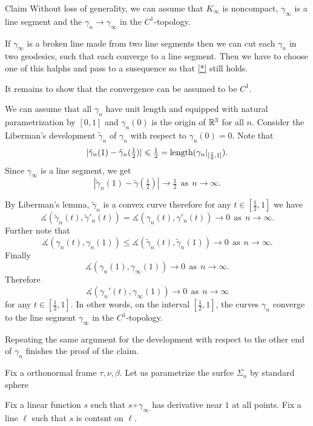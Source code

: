 \documentclass[a4paper,10pt]{amsart}
\begin{document}
\begin{thm}{Claim}
Without loss of generality, we can assume that $K_\infty$ is noncompact, $\gamma_\infty$ is a line segment 
and the $\gamma_n\to \gamma_\infty$ in the $C^1$-topology.
\end{thm}

If $\gamma_\infty$ is a broken line made from two line segments
then we can cut each $\gamma_n$ in two geodesics, such that each converge to a line segment.
Then we have to choose one of this halphs and pass to a susequence so that \ref{*} still holds.

It remains to show that the convergence can be assumed to be $C^1$.


We can assume that all $\gamma_n$ have unit length
and equipped with natural parametrization by $[0,1]$ and $\gamma_n(0)$ is the origin of $\mathbb{R}^3$ for all $n$.
Consider the Liberman's development $\tilde\gamma_n$ of $\gamma_n$ with respect to $\gamma_n(0)=0$. 
Note that 
\[|\tilde\gamma_n(1)-\tilde\gamma_n(\tfrac12)|\leqslant \tfrac12=\mathop{\rm length}\nolimits(\gamma_n|_{[\frac12,1]}).\]
Since $\gamma_\infty$ is a line segment, we get
\[|\tilde\gamma_n(1)-\tilde\gamma(\tfrac12)|\to \tfrac12\ \ \text{as}\ \ n\to \infty.\]

By Liberman's lemma, $\tilde\gamma_n$ is a convex curve therefore for any $t\in[\tfrac12,1]$ we have
\[\measuredangle(\tilde\gamma_n(t),\tilde\gamma'_n(t))=\measuredangle(\gamma_n(t),\gamma'_n(t))\to0
\ \ \text{as}\ \ 
n\to \infty.\]
Further note that
\[
\measuredangle(\gamma_n(t),\gamma_n(1))
\le
\measuredangle(\tilde\gamma_n(t),\tilde\gamma_n(1))
\to 0 
\ \ \text{as}
\ \ 
n\to \infty.
\]
Finally
\[\measuredangle(\gamma_n(1),\gamma_\infty(1))\to 0\ \ \text{as}
\ \ 
n\to \infty.\]
Therefore 
\[\measuredangle(\gamma_n'(t),\gamma_\infty(1))\to 0\ \ \text{as}
\ \ 
n\to \infty\]
for any $t\in[\tfrac12,1]$.
In other words, on the interval $[\tfrac12,1]$, the curves $\gamma_n$ converge to the line segment $\gamma_\infty$ in the $C^1$-topology.

Repeating the same argument for the development with respect to the other end of $\gamma_n$ finishes the proof of the claim. 

\medskip

Fix a orthonormal frame $\tau,\nu,\beta$.
Let us parametrize the surfce $\Sigma_n$ by standard sphere


Fix a linear function $s$ such that $s\circ\gamma_\infty$ 
has derivative near $1$ at all points.
Fix a line $\ell$ such that $s$ is contsnt on $\ell$.
\end{document}
